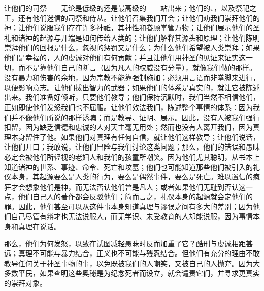 让他们的司祭——无论是低级的还是最高级的——站出来；他们的、，以及祭祀之王，还有他们迷信的司祭和侍从。让他们召集我们开会；让他们劝我们崇拜他们的神；让他们说服我们存在许多神祇，其神性和眷顾掌管万物；让他们展示他们的圣礼和诸神的起源与开端是如何传给人类的；让他们解释其源头和原理；让他们陈明崇拜他们的回报是什么，忽视的惩罚又是什么；为什么他们希望被人类崇拜；如果他们是幸福的，人的虔诚对他们有何贡献；并且让他们用神圣的见证来证实这一切，而不是靠他们自己的断言（因为凡人的权威没有分量），就像我们做的那样。没有暴力和伤害的余地，因为宗教不能靠强制施加；必须用言语而非拳脚来进行，以便影响意志。让他们拔出智力的武器；如果他们的体系是真实的，就让它被陈述出来。我们准备好倾听，只要他们教导；他们保持沉默时，我们当然不相信他们，正如即使他们发怒我们也不屈服。让他们效法我们，陈述整个事情的体系：因为我们并不像他们所说的那样诱骗；而是教导、证明、展示。因此，没有人被我们强行扣留，因为缺乏信德和忠诚的人对天主毫无用处；然而也没有人离开我们，因为真理本身留住了他。如果他们对真理有任何自信，就让他们这样教导；让他们说话，让他们开口；我敢说，让他们冒险与我们讨论这类问题；那么，他们的错误和愚昧必定会被他们所轻视的老妇人和我们的孩童所嘲笑。因为他们尤其聪明，从书本上知道诸神的世系、事迹、命令、死亡和坟墓；他们也可能知道那些他们被引入的礼仪本身，其起源要么是人类的行为，要么是偶然事件，要么是死亡。难以置信的疯狂才会想象他们是神，而无法否认他们曾是凡人；或者如果他们无耻到否认这一点，他们自己人的著作都会反驳他们；简而言之，礼仪本身的起源就会定他们的罪。因此，他们甚至可以从这件事本身知道真理与谬误之间有多大的差别；因为他们自己尽管有辩才也无法说服人，而无学识、未受教育的人却能说服，因为事情本身和真理在说话。\par

那么，他们为何发怒，以致在试图减轻愚昧时反而加重了它？酷刑与虔诚相距甚远；真理不可能与暴力结合，正义也不可能与残忍结合。但他们有充分的理由不敢教导任何关于神圣事物的事，以免既被我们的人嘲笑，又被自己的人抛弃。因为大多数平民，如果查明这些奥秘是为纪念死者而设立，就会谴责它们，并寻求更真实的崇拜对象。\par

\par

